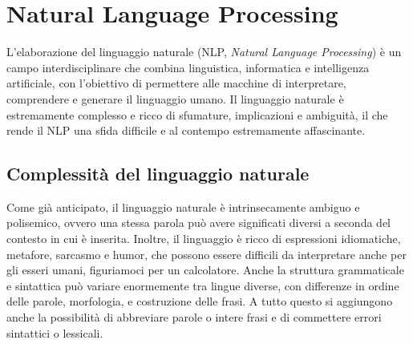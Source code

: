 \documentclass[12pt,a4paper,twoside,openright]{book}
\begin{document}
\section{Natural Language Processing}
L'elaborazione del linguaggio naturale (NLP, \emph{Natural Language Processing}) è un campo interdisciplinare che combina linguistica, informatica e intelligenza artificiale, con l'obiettivo di permettere alle macchine di interpretare, comprendere e generare il linguaggio umano. Il linguaggio naturale è estremamente complesso e ricco di sfumature, implicazioni e ambiguità, il che rende il NLP una sfida difficile e al contempo estremamente affascinante.


\subsection{Complessità del linguaggio naturale}
Come già anticipato, il linguaggio naturale è intrinsecamente ambiguo e polisemico, ovvero una stessa parola può avere significati diversi a seconda del contesto in cui è inserita. Inoltre, il linguaggio è ricco di espressioni idiomatiche, metafore, sarcasmo e humor, che possono essere difficili da interpretare anche per gli esseri umani, figuriamoci per un calcolatore. Anche la struttura grammaticale e sintattica può variare enormemente tra lingue diverse, con differenze in ordine delle parole, morfologia, e costruzione delle frasi.
A tutto questo si aggiungono anche la possibilità di abbreviare parole o intere frasi e di commettere errori sintattici o lessicali.
\end{document}
